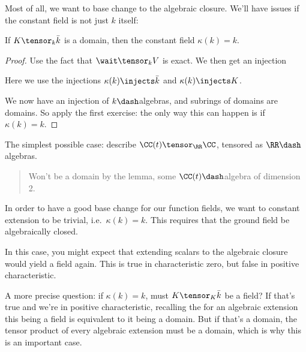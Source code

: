 Most of all, we want to base change to the algebraic closure. We'll have
issues if the constant field is not just \(k\) itself:

\begin{lemma}

If \(K\tensor_k \bar k\) is a domain, then the constant field
\(\kappa(k) = k\).

\end{lemma}

\begin{proof}

Use the fact that \(\wait \tensor_k V\) is exact. We then get an
injection

\begin{center}
\end{center}

Here we use the injections \(\kappa(k) \injects \bar k\) and
\(\kappa(k) \injects K\).

We now have an injection of \(k\dash\)algebras, and subrings of domains
are domains. So apply the first exercise: the only way this can happen
is if \(\kappa(k) = k\).

\end{proof}

\begin{exercise}

The simplest possible case: describe \(\CC(t) \tensor_\RR \CC\),
tensored as \(\RR\dash\)algebras.

\begin{quote}
Won't be a domain by the lemma, some \(\CC(t)\dash\)algebra of dimension
2.
\end{quote}

\end{exercise}

In order to have a good base change for our function fields, we want to
constant extension to be trivial, i.e.~\(\kappa(k) = k\). This requires
that the ground field be algebraically closed.

In this case, you might expect that extending scalars to the algebraic
closure would yield a field again. This is true in characteristic zero,
but false in positive characteristic.

A more precise question: if \(\kappa(k) = k\), must
\(K\tensor_K \bar k\) be a field? If that's true and we're in positive
characteristic, recalling the for an algebraic extension this being a
field is equivalent to it being a domain. But if that's a domain, the
tensor product of every algebraic extension must be a domain, which is
why this is an important case.

